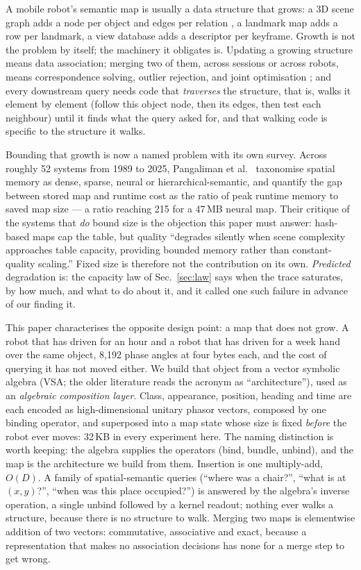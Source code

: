 \documentclass[conference]{IEEEtran}
\begin{document}
A mobile robot's semantic map is usually a data structure that grows: a 3D
scene graph adds a node per object and edges per relation
\cite{hughes2022hydra,gu2024conceptgraphs}, a landmark map adds a row per
landmark, a view database adds a descriptor per keyframe. Growth is not
the problem by itself; the machinery it obligates is. Updating a growing
structure means data association; merging two of them, across sessions
or across robots, means correspondence solving, outlier rejection, and
joint optimisation \cite{tian2022kimeramulti,chang2023hydramulti}; and
every downstream query needs code that \emph{traverses} the structure,
that is, walks it element by element (follow this object node, then its
edges, then test each neighbour) until it finds what the query asked
for, and that walking code is specific to the structure it walks.

Bounding that growth is now a named problem with its own survey. Across
roughly 52 systems from 1989 to 2025, Pangaliman et al.\
\cite{pangaliman2026memorysurvey} taxonomise spatial memory as dense,
sparse, neural or hierarchical-semantic, and quantify the gap between
stored map and runtime cost as the ratio of peak runtime memory to saved
map size --- a ratio reaching 215 for a 47\,MB neural map. Their critique of the systems that \emph{do} bound size is
the objection this paper must answer: hash-based maps cap the table, but
quality ``degrades silently when scene complexity approaches table
capacity, providing bounded memory rather than constant-quality
scaling.'' Fixed size is therefore not the contribution on its own.
\emph{Predicted} degradation is: the capacity law of Sec.~\ref{sec:law}
says when the trace saturates, by how much, and what to do about it, and
it called one such failure in advance of our finding it.

This paper characterises the opposite design point: a map that does not
grow. A robot that has driven for an hour and a robot that has driven for
a week hand over the same object, 8{,}192 phase angles at four bytes
each, and the cost of querying it has not moved either. We build that
object from a vector symbolic algebra (VSA; the older literature reads
the acronym as ``architecture''), used as an \emph{algebraic composition
layer}. Class, appearance, position, heading and time are each encoded as
high-dimensional unitary phasor vectors, composed by one binding
operator, and superposed into a map state whose size is fixed
\emph{before} the robot ever moves: 32\,KB in every experiment here. The
naming distinction is worth keeping: the algebra supplies the operators
(bind, bundle, unbind), and the map is the architecture we build from
them. Insertion is one multiply-add, $O(D)$. A family of
spatial-semantic queries (``where was a chair?'', ``what is at
$(x,y)$?'', ``when was this place occupied?'') is answered by the
algebra's inverse operation, a single unbind followed by a kernel
readout; nothing ever walks a structure, because there is no structure to
walk. Merging two maps is elementwise addition of two vectors:
commutative, associative and exact, because a representation that makes
no association decisions has none for a merge step to get wrong.
\end{document}
